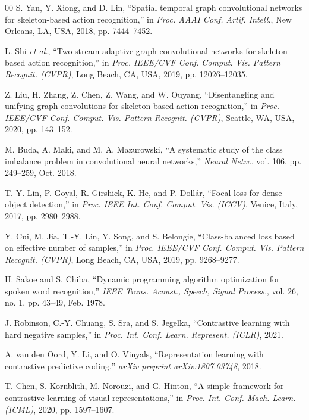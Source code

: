 \documentclass{ieeeaccess}
\begin{document}
\begin{thebibliography}{00}
S. Yan, Y. Xiong, and D. Lin, ``Spatial temporal graph convolutional networks for skeleton-based action recognition,'' in \emph{Proc. AAAI Conf. Artif. Intell.}, New Orleans, LA, USA, 2018, pp. 7444--7452.

L. Shi \emph{et al.}, ``Two-stream adaptive graph convolutional networks for skeleton-based action recognition,'' in \emph{Proc. IEEE/CVF Conf. Comput. Vis. Pattern Recognit. (CVPR)}, Long Beach, CA, USA, 2019, pp. 12026--12035.

Z. Liu, H. Zhang, Z. Chen, Z. Wang, and W. Ouyang, ``Disentangling and unifying graph convolutions for skeleton-based action recognition,'' in \emph{Proc. IEEE/CVF Conf. Comput. Vis. Pattern Recognit. (CVPR)}, Seattle, WA, USA, 2020, pp. 143--152.

M. Buda, A. Maki, and M. A. Mazurowski, ``A systematic study of the class imbalance problem in convolutional neural networks,'' \emph{Neural Netw.}, vol. 106, pp. 249--259, Oct. 2018.

T.-Y. Lin, P. Goyal, R. Girshick, K. He, and P. Dollár, ``Focal loss for dense object detection,'' in \emph{Proc. IEEE Int. Conf. Comput. Vis. (ICCV)}, Venice, Italy, 2017, pp. 2980--2988.

Y. Cui, M. Jia, T.-Y. Lin, Y. Song, and S. Belongie, ``Class-balanced loss based on effective number of samples,'' in \emph{Proc. IEEE/CVF Conf. Comput. Vis. Pattern Recognit. (CVPR)}, Long Beach, CA, USA, 2019, pp. 9268--9277.

H. Sakoe and S. Chiba, ``Dynamic programming algorithm optimization for spoken word recognition,'' \emph{IEEE Trans. Acoust., Speech, Signal Process.}, vol. 26, no. 1, pp. 43--49, Feb. 1978.

J. Robinson, C.-Y. Chuang, S. Sra, and S. Jegelka, ``Contrastive learning with hard negative samples,'' in \emph{Proc. Int. Conf. Learn. Represent. (ICLR)}, 2021.

A. van den Oord, Y. Li, and O. Vinyals, ``Representation learning with contrastive predictive coding,'' \emph{arXiv preprint arXiv:1807.03748}, 2018.

T. Chen, S. Kornblith, M. Norouzi, and G. Hinton, ``A simple framework for contrastive learning of visual representations,'' in \emph{Proc. Int. Conf. Mach. Learn. (ICML)}, 2020, pp. 1597--1607.

\end{thebibliography}
\end{document}
